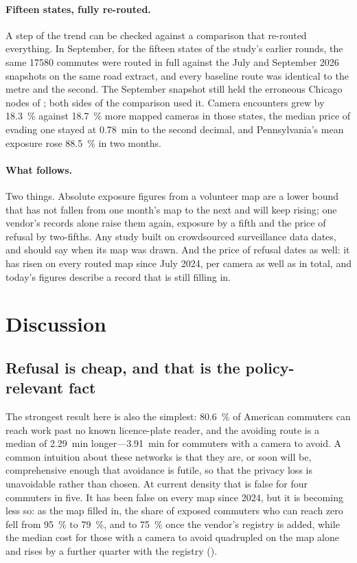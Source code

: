 \documentclass[11pt,twoside]{article}
\begin{document}
\paragraph{Fifteen states, fully re-routed.} A step of the trend can be checked against a
comparison that re-routed everything. In September, for the fifteen states of the study's
earlier rounds, the same \num{17580} commutes were routed in full against the July and
September 2026 snapshots on the same road extract, and every baseline route was identical to
the metre and the second. The September snapshot still held the erroneous Chicago nodes of
; both sides of the comparison used it. Camera
encounters grew by \SI{18.3}{\percent} against \SI{18.7}{\percent} more mapped cameras in
those states, the median price of evading one stayed at \SI{0.78}{\minute} to the second
decimal, and Pennsylvania's mean exposure rose \SI{88.5}{\percent} in two months.

\paragraph{What follows.} Two things. Absolute exposure figures from a volunteer map are a
lower bound that has not fallen from one month's map to the next and will keep rising; one vendor's records alone
raise them again, exposure by a fifth and the price of refusal by two-fifths. Any study built
on crowdsourced surveillance data dates, and should say when its map was drawn. And the price
of refusal dates as well: it has risen on every routed map since July 2024, per camera as well
as in total, and
today's figures describe a record that is still filling in.

\section{Discussion}
\label{sec:discussion}

\subsection{Refusal is cheap, and that is the policy-relevant fact}

The strongest result here is also the simplest: \SI{80.6}{\percent} of American commuters
can reach work past no known licence-plate reader, and the avoiding route is a median of
\SI{2.29}{\minute} longer---\SI{3.91}{\minute} for commuters with a camera to avoid. A common
intuition about these networks is that they are, or soon will be, comprehensive enough that
avoidance is futile, so that the privacy loss is unavoidable rather than chosen. At current
density that is false for four commuters in five. It has been false on every map since 2024,
but it is becoming less so: as the map filled in, the share of exposed commuters who can reach
zero fell from \SI{95}{\percent} to \SI{79}{\percent}, and to \SI{75}{\percent} once the
vendor's registry is added, while the median cost for those with a camera to avoid quadrupled
on the map alone and rises by a further quarter with the registry ().
\end{document}
